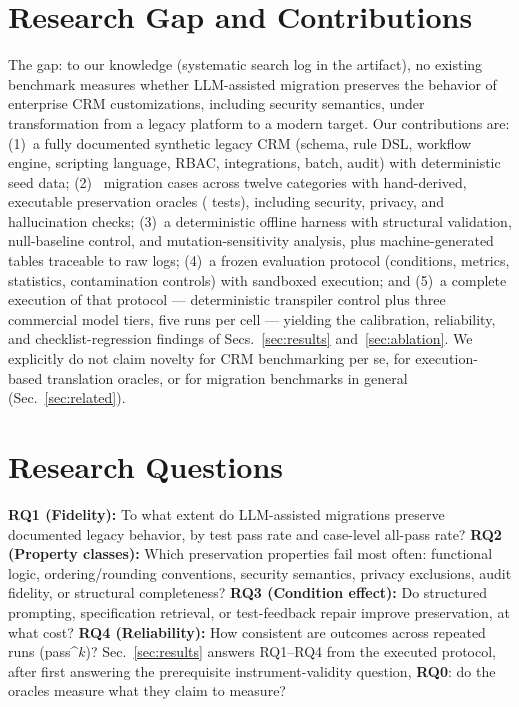 \documentclass[journal]{IEEEtran}
\begin{document}
\section{Research Gap and Contributions}
\label{sec:gap}
The gap: to our knowledge (systematic search log in the artifact), no existing benchmark measures whether LLM-assisted migration preserves the behavior
of enterprise CRM customizations, including security semantics, under transformation from a
legacy platform to a modern target. Our contributions are:
(1)~a fully documented synthetic legacy CRM (schema, rule DSL, workflow engine, scripting
language, RBAC, integrations, batch, audit) with deterministic seed data;
(2)~\NumCases{} migration cases across twelve categories with hand-derived, executable
preservation oracles (\NumTests{} tests), including security, privacy, and hallucination
checks;
(3)~a deterministic offline harness with structural validation, null-baseline control, and
mutation-sensitivity analysis, plus machine-generated tables traceable to raw logs;
(4)~a frozen evaluation protocol (conditions, metrics, statistics, contamination controls)
with sandboxed execution; and (5)~a complete execution of that protocol --- deterministic
transpiler control plus three commercial model tiers, five runs per cell --- yielding the
calibration, reliability, and checklist-regression findings of Secs.~\ref{sec:results}
and~\ref{sec:ablation}. We explicitly do not claim novelty for CRM benchmarking per se, for
execution-based translation oracles, or for migration benchmarks in general
(Sec.~\ref{sec:related}).

\section{Research Questions}
\label{sec:rqs}
\textbf{RQ1 (Fidelity):} To what extent do LLM-assisted migrations preserve documented legacy
behavior, by test pass rate and case-level all-pass rate?
\textbf{RQ2 (Property classes):} Which preservation properties fail most often: functional
logic, ordering/rounding conventions, security semantics, privacy exclusions, audit fidelity,
or structural completeness?
\textbf{RQ3 (Condition effect):} Do structured prompting, specification retrieval, or
test-feedback repair improve preservation, at what cost?
\textbf{RQ4 (Reliability):} How consistent are outcomes across repeated runs
(pass\textasciicircum{}$k$)?
Sec.~\ref{sec:results} answers RQ1--RQ4 from the executed protocol, after first answering
the prerequisite instrument-validity question, \textbf{RQ0}: do the oracles measure what
they claim to measure?
\end{document}
